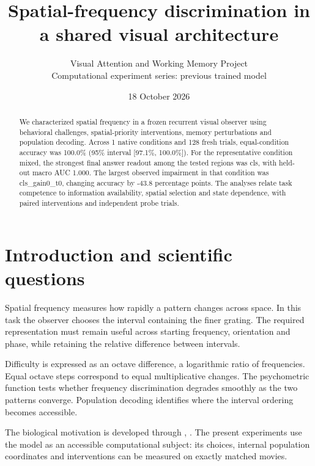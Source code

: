 \documentclass[11pt]{article}
\begin{document}
\title{\color{ink}Spatial-frequency discrimination in a shared visual architecture}
\author{Visual Attention and Working Memory Project\\Computational experiment series: previous trained model}\date{18 October 2026}\maketitle
\begin{abstract}
We characterized spatial frequency in a frozen recurrent visual observer using behavioral challenges, spatial-priority interventions, memory perturbations and population decoding. Across 1 native conditions and 128 fresh trials, equal-condition accuracy was 100.0\% (95\% interval [97.1\%, 100.0\%]). For the representative condition mixed, the strongest final answer readout among the tested regions was cls, with held-out macro AUC 1.000. The largest observed impairment in that condition was cls\_\allowbreak{}gain0\_\allowbreak{}t0, changing accuracy by -43.8 percentage points. The analyses relate task competence to information availability, spatial selection and state dependence, with paired interventions and independent probe trials.
\end{abstract}
\section{Introduction and scientific questions}
Spatial frequency measures how rapidly a pattern changes across space. In this task the observer chooses the interval containing the finer grating. The required representation must remain useful across starting frequency, orientation and phase, while retaining the relative difference between intervals.

Difficulty is expressed as an octave difference, a logarithmic ratio of frequencies. Equal octave steps correspond to equal multiplicative changes. The psychometric function tests whether frequency discrimination degrades smoothly as the two patterns converge. Population decoding identifies where the interval ordering becomes accessible.

The biological motivation is developed through \cite{frequency}, \cite{contrast}. The present experiments use the model as an accessible computational subject: its choices, internal population coordinates and interventions can be measured on exactly matched movies.
\end{document}
